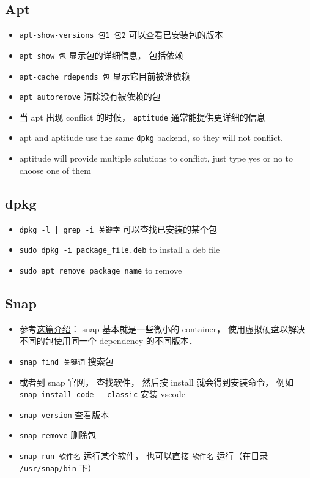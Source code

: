 
\begin{issues}
\issueDraft
\end{issues}

\subsection{Apt}
\begin{itemize}
\item \verb|apt-show-versions 包1 包2| 可以查看已安装包的版本
\item \verb|apt show 包| 显示包的详细信息， 包括依赖
\item \verb|apt-cache rdepends 包| 显示它目前被谁依赖
\item \verb|apt autoremove| 清除没有被依赖的包
\item 当 apt 出现 conflict 的时候， \verb|aptitude| 通常能提供更详细的信息
\item apt and aptitude use the same \verb|dpkg| backend, so they will not conflict.
\item aptitude will provide multiple solutions to conflict, just type yes or no to choose one of them
\end{itemize}

\subsection{dpkg}
\begin{itemize}
\item \verb`dpkg -l | grep -i 关键字` 可以查找已安装的某个包
\item \verb|sudo dpkg -i package_file.deb| to install a deb file
\item \verb|sudo apt remove package_name| to remove
\end{itemize}

\subsection{Snap}
\begin{itemize}
\item 参考\href{https://www.howtogeek.com/660193/how-to-work-with-snap-packages-on-linux/}{这篇介绍}： snap 基本就是一些微小的 container， 使用虚拟硬盘以解决不同的包使用同一个 dependency 的不同版本．
\item \verb|snap find 关键词| 搜索包
\item 或者到 snap 官网， 查找软件， 然后按 install 就会得到安装命令， 例如 \verb|snap install code --classic| 安装 vscode
\item \verb|snap version| 查看版本
\item \verb|snap remove| 删除包
\item \verb|snap run 软件名| 运行某个软件， 也可以直接 \verb|软件名| 运行（在目录 \verb|/usr/snap/bin| 下）
\end{itemize}
